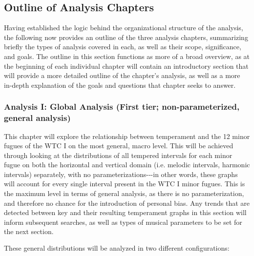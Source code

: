     \subsection{Outline of Analysis
Chapters}\label{outline-of-analysis-chapters}

Having established the logic behind the organizational structure of the
analysis, the following now provides an outline of the three analysis
chapters, summarizing briefly the types of analysis covered in each, as
well as their scope, significance, and goals. The outline in this
section functions as more of a broad overview, as at the beginning of
each individual chapter will contain an introductory section that will
provide a more detailed outline of the chapter's analysis, as well as a
more in-depth explanation of the goals and questions that chapter seeks
to answer.

\subsubsection{Analysis I: Global Analysis (First tier;
non-parameterized, general
analysis)}\label{analysis-i-global-analysis-first-tier-non-parameterized-general-analysis}

This chapter will explore the relationship between temperament and the
12 minor fugues of the WTC I on the most general, macro level. This will
be achieved through looking at the distributions of all tempered
intervals for each minor fugue on both the horizontal and vertical
domain (i.e. melodic intervals, harmonic intervals) separately, with no
parameterizations-\/-\/-in other words, these graphs will account for
every single interval present in the WTC I minor fugues. This is the
maximum level in terms of general analysis, as there is no
parameterization, and therefore no chance for the introduction of
personal bias. Any trends that are detected between key and their
resulting temperament graphs in this section will inform subsequent
searches, as well as types of musical parameters to be set for the next
section.

These general distributions will be analyzed in two different
configurations:

